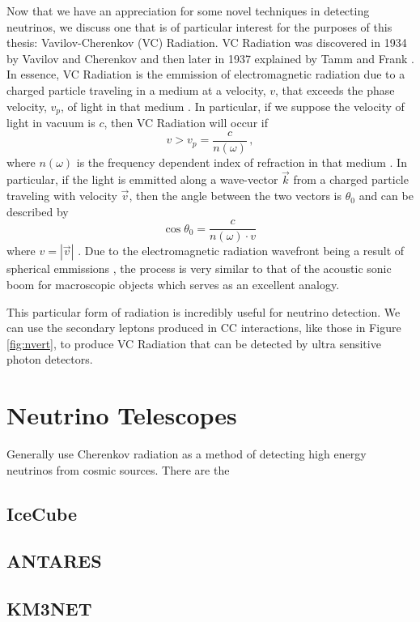 Now that we have an appreciation for some novel techniques in detecting neutrinos, we discuss one that is of particular interest for the purposes of this thesis: Vavilov-Cherenkov (VC) Radiation. VC Radiation was discovered in 1934 by Vavilov \cite{vav_og} and Cherenkov \cite{cher_og} and then later in 1937 explained by Tamm and Frank \cite{tamm}. In essence, VC Radiation is the emmission of electromagnetic radiation due to a charged particle traveling in a medium at a velocity, $v$, that exceeds the phase velocity, $v_{p}$, of light in that medium \cite{ginz}. In particular, if we suppose the velocity of light in vacuum is $c$, then VC Radiation will occur if
\begin{equation}
  v > v_{p} = \frac{c}{n(\omega)}\, ,
\end{equation}
where $n(\omega)$ is the frequency dependent index of refraction in that medium \cite{ginz}. In particular, if the light is emmitted along a wave-vector $\vec{k}$ from a charged particle traveling with velocity $\vec{v}$, then the angle between the two vectors is $\theta_{0}$ and can be described by
\begin{equation}
  \cos\theta_{0} = \frac{c}{n(\omega)\cdot v}\,
\end{equation}
where $v = |\vec{v}|$ \cite{ginz}. Due to the electromagnetic radiation wavefront being a result of spherical emmissions \cite{ginz}, the process is very similar to that of the acoustic sonic boom for macroscopic objects \cite{ginz} which serves as an excellent analogy.

This particular form of radiation is incredibly useful for neutrino detection. We can use the secondary leptons produced in CC interactions, like those in Figure \ref{fig:nvert}, to produce VC Radiation that can be detected by ultra sensitive photon detectors. 

\section{Neutrino Telescopes}

Generally use Cherenkov radiation as a method of detecting high energy neutrinos from cosmic sources. There are the 

\subsection{IceCube}

\subsection{ANTARES}

\subsection{KM3NET}
